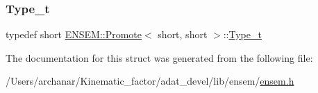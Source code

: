 \subsubsection{\texorpdfstring{Type\_t}{Type\_t}\hspace{0.1cm}{\footnotesize\ttfamily [2/2]}}
{\footnotesize\ttfamily typedef short \mbox{\hyperlink{structENSEM_1_1Promote}{E\+N\+S\+E\+M\+::\+Promote}}$<$ short, short $>$\+::\mbox{\hyperlink{structENSEM_1_1Promote_3_01short_00_01short_01_4_a6b4eee8b5b19e8dd07645327f1e73377}{Type\+\_\+t}}}



The documentation for this struct was generated from the following file\+:\begin{DoxyCompactItemize}
\item 
/\+Users/archanar/\+Kinematic\+\_\+factor/adat\+\_\+devel/lib/ensem/\mbox{\hyperlink{lib_2ensem_2ensem_8h}{ensem.\+h}}\end{DoxyCompactItemize}
